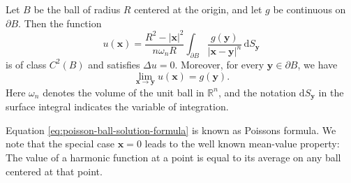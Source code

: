 \begin{Theorem}
\label{thm:poisson-ball-formula}
Let $B$ be the ball of radius $R$ centered at the origin, and let $g$ be continuous on $\partial B$. Then the function
\begin{equation}\label{eq:poisson-ball-solution-formula}
u(\bm{x})=\dfrac{R^2-|\bm{x}|^2}{n\omega_nR}\int_{\partial B}\dfrac{g(\bm{y})}{|\bm{x}-\bm{y}|^n}\,\mathrm{d}S_{\bm{y}}
\end{equation}
is of class $C^2(B)$ and satisfies $\Delta u=0$. Moreover, for every $\bm{y}\in\partial B$, we have
\begin{equation}\label{eq:poisson-ball-boundary-limit}
\lim_{\bm{x}\to\bm{y}}u(\bm{x})=g(\bm{y}).
\end{equation}
Here $\omega_n$ denotes the volume of the unit ball in $\mathbb{R}^n$, and the notation $\mathrm{d}S_{\bm{y}}$ in the surface integral indicates the variable of integration.
\end{Theorem}

Equation \eqref{eq:poisson-ball-solution-formula} is known as Poisson\textquotesingle s formula. We note that the special case $\bm{x}=0$ leads to the well known mean-value property: The value of a harmonic function at a point is equal to its average on any ball centered at that point.

